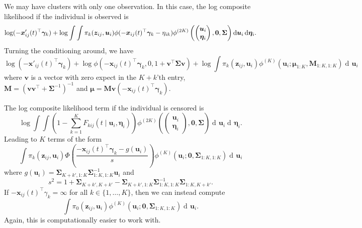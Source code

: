\documentclass{article}
\newcommand\mat[1]{\mathbf{#1}}
\renewcommand\vec{\bm}
\newcommand\der{\operatorname{d\!}{}}
\begin{document}
We may have clusters with only one observation. In this case, the log composite 
likelihood if the individual is observed is %
%
$$
\log(-\vec x'_{ij}(t)^\top\vec\gamma_k) 
  +\log\int\int 
    \pi_k(\vec z_{ij},\vec u_i)\phi(-\vec x_{ij}(t)^\top\vec\gamma_k - \eta_{ik})  \\ 
    \phi^{(2K)}\left(
      \begin{pmatrix}
        \vec u_i \\ \vec\eta_i
      \end{pmatrix}, \vec 0,\mat \Sigma\right)
    \der \vec u_i\der \vec\eta_i.
$$%
%
Turning the conditioning around, we have %
%
$$
\log(-\vec x'_{ij}(t)^\top\vec\gamma_k)  
  + \log \phi\left(
    -\vec x_{ij}(t)^\top\vec\gamma_k, 0, 1 + \vec v^\top\mat\Sigma\vec v\right)
  + \log\int \pi_k(\vec z_{ij},\vec u_i)
  \phi^{(K)}\left(
    \vec u_i; 
    \vec\mu_{1:K},
    \mat M_{1:K, 1:K}
    \right)\der\vec u_i
$$%
%
where $\vec v$ is a vector with zero expect in the $K + k$'th entry, 
$\mat M = (\vec v\vec v^\top + \mat\Sigma^{-1})^{-1}$ and
$\vec\mu = \mat M\vec v(-\vec x_{ij}(t)^\top\vec\gamma_k)$.


The log composite likelihood term if the individual is censored is%
%
$$
\log \int\int 
  \left(1 - \sum_{k = 1}^K F_{kij}(t\mid \vec u_i, \vec\eta_i)\right)
  \phi^{(2K)}\left(
      \begin{pmatrix}
        \vec u_i \\ \vec\eta_i
      \end{pmatrix}, \vec 0,\mat \Sigma\right)
  \der \vec u_i\der \vec\eta_i.
$$%
% 
Leading to $K$ terms of the form %
%
$$
  \int \pi_k(\vec z_{ij},\vec u_i)
  \Phi\left(
    \frac{-\vec x_{ij}(t)^\top\vec\gamma_k - g(\vec u_i)}
         {s}
    \right)\phi^{(K)}\left(
    \vec u_i; 
    \vec 0,
    \mat\Sigma_{1:K, 1:K}
    \right)\der\vec u_i
$$%
%
where $g(\vec u_i) = 
    \mat\Sigma_{K + k', 1:K}\mat \Sigma_{1:K, 1:K}^{-1}\vec u_i$ and%
$$
s^2 = 1 + \mat\Sigma_{K + k', K + k'} 
  - \mat\Sigma_{K + k',1:K}\mat\Sigma_{1:K, 1:K}^{-1}\mat\Sigma_{1:K,K + k'}.
$$%
% 
If  $-\vec x_{ij}(t)^\top\gamma_k = \infty$ for all 
$k\in\{1,\dots,K\}$, then we can instead compute %
%
$$
  \int \pi_0(\vec z_{ij},\vec u_i)
  \phi^{(K)}\left(
    \vec u_i; 
    \vec 0,
    \mat\Sigma_{1:K, 1:K}
    \right)\der\vec u_i. 
$$%
% 
Again, this is computationally easier to work with.


\end{document}

